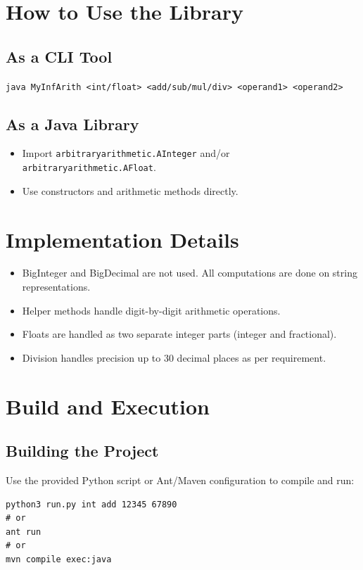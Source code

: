 \documentclass[12pt]{article}
\begin{document}
\section{How to Use the Library}

\subsection{As a CLI Tool}
\texttt{java MyInfArith <int/float> <add/sub/mul/div> <operand1> <operand2>}

\subsection{As a Java Library}
\begin{itemize}
  \item Import \texttt{arbitraryarithmetic.AInteger} and/or \texttt{arbitraryarithmetic.AFloat}.
  \item Use constructors and arithmetic methods directly.
\end{itemize}

\section{Implementation Details}
\begin{itemize}
  \item BigInteger and BigDecimal are not used. All computations are done on string representations.
  \item Helper methods handle digit-by-digit arithmetic operations.
  \item Floats are handled as two separate integer parts (integer and fractional).
  \item Division handles precision up to 30 decimal places as per requirement.
\end{itemize}

\section{Build and Execution}

\subsection{Building the Project}
Use the provided Python script or Ant/Maven configuration to compile and run:

\begin{verbatim}
python3 run.py int add 12345 67890
# or
ant run
# or
mvn compile exec:java
\end{verbatim}
\end{document}
